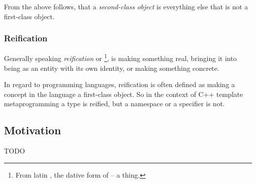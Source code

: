 From the above follows, that a {\em second-class object} is everything else that
is not a first-class object.

\subsubsection{Reification}
\label{term-reification}

Generally speaking {\em reification} or \footnote{From latin , the dative form of  -- a thing.}, is making something
real, bringing it into being as an entity with its own identity,
or making something concrete.

In regard to programming languages, reification is often defined as making
a concept in the language a first-class object. So in the context of C++ template
metaprogramming a type is reified, but a namespace or a specifier is not.

\subsection{Motivation}

TODO

